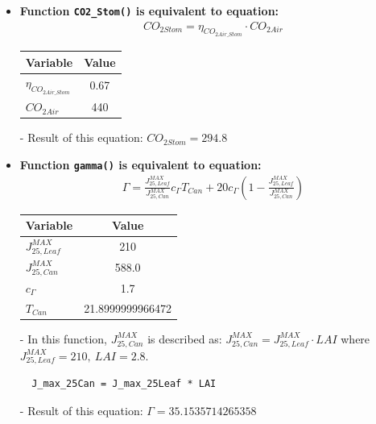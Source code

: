 \documentclass[a4paper]{article}
\numberwithin{equation}{section}
\begin{document}
\begin{itemize}
  \item \textbf{Function \texttt{CO2\_Stom()} is equivalent to equation:}
        \begin{align*}
          CO_{2Stom} = \eta_{CO_{2Air\_Stom}} \cdot CO_{2Air}
        \end{align*}

        \begin{table}[H]
          \centering
          \begin{tabular}{@{}lS@{}}
            \toprule
            \textbf{Variable}          & \textbf{Value} \\
            \midrule
            \(\eta_{CO_{2Air\_Stom}}\) & 0.67           \\
            \(CO_{2Air}\)              & 440            \\
            \bottomrule
          \end{tabular}
        \end{table}

  \item[-] Result of this equation: \( CO_{2Stom} = 294.8 \)

  \item \textbf{Function \texttt{gamma()} is equivalent to equation:}
        \begin{align*}
          \Gamma = \frac{J^{MAX}_{25,Leaf}}{J^{MAX}_{25,Can}}c_{\Gamma} T_{Can} + 20 c_{\Gamma} \left(1-\frac{J^{MAX}_{25,Leaf}}{J^{MAX}_{25,Can}}\right)
        \end{align*}

        \begin{table}[H]
          \centering
          \begin{tabular}{@{}lS[table-format=3.13]@{}}
            \toprule
            \textbf{Variable}     & \textbf{Value}   \\
            \midrule
            \(J^{MAX}_{25,Leaf}\) & 210              \\
            \(J^{MAX}_{25,Can}\)  & 588.0            \\
            \(c_{\Gamma}\)        & 1.7              \\
            \(T_{Can}\)           & 21.8999999966472 \\
            \bottomrule
          \end{tabular}
        \end{table}

  \item[-] In this function, \(J^{MAX}_{25,Can}\) is described as: \(J^{MAX}_{25,Can} = J^{MAX}_{25,Leaf} \cdot LAI\) where \(J^{MAX}_{25,Leaf} = 210,\ LAI = 2.8\).
        \begin{mdframed}[leftline=false,rightline=false,backgroundcolor=magenta!10,nobreak=true]
          \begin{verbatim}
  J_max_25Can = J_max_25Leaf * LAI
          \end{verbatim}
        \end{mdframed}
  \item[-] Result of this equation: \(\Gamma = 35.1535714265358\)


\end{itemize}
\end{document}
